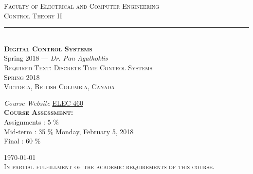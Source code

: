 \documentclass{scrreprt}
\theoremstyle{plain}
\theoremstyle{definition}
\theoremstyle{remark}
\begin{document}
\begin{titlepage}
	\begin{center}
		{\Huge \textsc{Faculty of Electrical and Computer Engineering} \\ \vspace{4pt}}
		{\Huge \textsc{Control Theory II } \\ \vspace{4pt}}  
		\rule[13pt]{1\textwidth}{1pt} \\ \vspace{1pt}
		{\LARGE \textbf{{\textsc{Digital Control Systems}}} \\ Spring 2018 --- \textit{Dr. Pan Agathoklis} \\ }
		{\Large \textsc{Required Text: Discrete Time Control Systems} \\} 
		\vspace{4pt} 
		{\Large \textsc{Spring 2018}} \\ 
		\vspace{20pt}
		{\Large \textsc{Victoria, British Columbia, Canada} \\ \vspace{45pt} }
		
		\begin{minipage}{0.96\linewidth}
			\begin{flushright}
				{
					\large \textit{Course Website} \href{http://www.ece.uvic.ca/~panagath/ELEC460/ELEC460.html}{ELEC 460}  \\
					\textsc{\textbf{Course Assessment:}} \\
					Assignments	: 5 \% \\
					Mid-term	: 35 \% Monday, February 5, 2018 \\
					Final	: 60 \%} \\
			\end{flushright}
		\end{minipage}

		{\Large \textsc{\today} \\ \vspace{15pt}
			{\Large \textsc{In partial fulfillment of the academic requirements of this course. \\
				}
			}	
		}
		
	\end{center}
\end{titlepage}
\tableofcontents
\listoffigures
\listoftables
\lstlistoflistings
\end{document}
